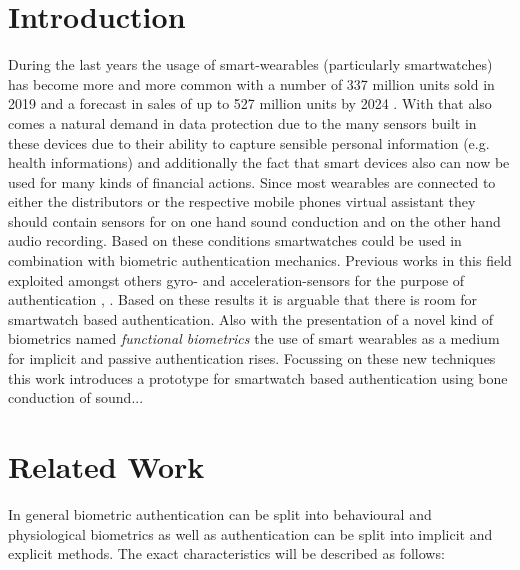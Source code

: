 \section{Introduction}
During the last years the usage of smart-wearables (particularly smartwatches) has become more and more common with a number of 337 million units sold in 2019 and a forecast in sales of up to 527 million units by 2024 \cite{tenzer}.
With that also comes a natural demand in data protection due to the many sensors built in these devices due to their ability to capture sensible personal information (e.g. health informations) and additionally the fact that smart devices also can now be used for many kinds of financial actions.\newline
Since most wearables are connected to either the distributors or the respective mobile phones virtual assistant they should contain sensors for on one hand sound conduction and on the other hand audio recording.\newline
Based on these conditions smartwatches could be used in combination with biometric authentication mechanics.\newline
\newline
Previous works in this field exploited amongst others gyro- and acceleration-sensors for the purpose of authentication \cite{johnston2015smartwatch}, \cite{yang2015motionauth}.
Based on these results it is arguable that there is room for smartwatch based authentication. Also with the presentation of a novel kind of biometrics named \textit{functional biometrics} the use of smart wearables as a medium for implicit and passive authentication rises.\newline
\newline
Focussing on these new techniques this work introduces a prototype for smartwatch based authentication using bone conduction of sound...     


\section{Related Work}
In general biometric authentication can be split into behavioural and physiological biometrics as well as authentication can be split into implicit and explicit methods. The exact characteristics will be described as follows: 
